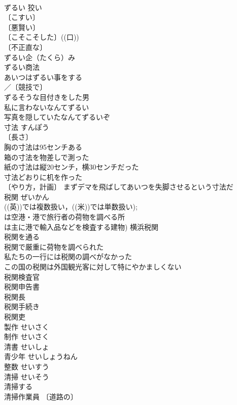 \documentclass[8pt]{extreport}
\begin{document}
\begin{CJK}{UTF8}{min}
\\	ずるい	狡い	
\\	〔こすい〕
\\	〔悪賢い〕
\\	〔こそこそした〕((口)) 
\\	〔不正直な〕
\\	ずるい企（たくら）み 
\\	ずるい商法 
\\	あいつはずるい事をする 
\\	／〔競技で〕
\\	ずるそうな目付きをした男 
\\	私に言わないなんてずるい 
\\	写真を隠していたなんてずるいぞ 
\\	寸法	すんぽう	
\\	〔長さ〕
\\	胸の寸法は95センチある 
\\	箱の寸法を物差しで測った 
\\	紙の寸法は縦20センチ，横30センチだった 
\\	寸法どおりに机を作った 
\\	〔やり方，計画〕 まずデマを飛ばしてあいつを失脚させるという寸法だ 
\\	税関	ぜいかん	
\\	((英))では複数扱い，((米))では単数扱い); 
\\	は空港・港で旅行者の荷物を調べる所
\\	は主に港で輸入品などを検査する建物) 横浜税関 
\\	税関を通る 
\\	税関で厳重に荷物を調べられた 
\\	私たちの一行には税関の調べがなかった 
\\	この国の税関は外国観光客に対して特にやかましくない 
\\	税関検査官 
\\	税関申告書 
\\	税関長 
\\	税関手続き 
\\	税関吏 
\\	製作	せいさく	
\\	制作	せいさく	
\\	清書	せいしょ	
\\	青少年	せいしょうねん	
\\	整数	せいすう	
\\	清掃	せいそう	
\\	清掃する 
\\	清掃作業員 〔道路の〕

\end{CJK}
\end{document}
